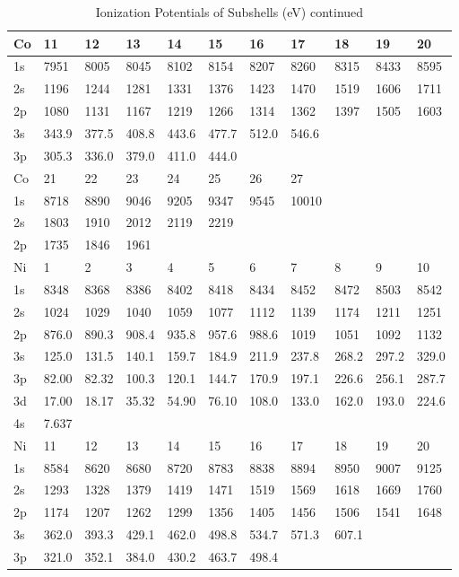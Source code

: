 \begin{table}
\caption{Ionization Potentials of Subshells (eV) continued}
\begin{tabular}{lllllllllll}
\hline
Co& 11&  12&  13&  14&  15&  16&  17&  18&  19&  20\\
\hline
1s&  7951&  8005&  8045&  8102&  8154&
8207&  8260&  8315&  8433&  8595\\
2s&  1196&  1244&  1281&  1331&  1376&  1423&  1470&
1519&  1606&  1711\\
2p&  1080&  1131&  1167&  1219&  1266&  1314&  1362&  1397&  1505&
1603\\
3s& 343.9& 377.5& 408.8& 443.6& 477.7& 512.0& 546.6\\
3p& 305.3& 336.0& 379.0&
411.0&
444.0\\
Co& 21& 22&  23&  24&  25&  26&  27\\
1s&  8718&  8890&  9046&  9205&  9347&  9545&
10010\\
2s&  1803&  1910&  2012&  2119&  2219\\
2p&  1735&  1846&  1961\\
\hline
Ni& 1& 2&  3&
4&   5&   6&   7&   8&   9&  10\\
1s&  8348&  8368&  8386&  8402&  8418&  8434&  8452&  8472&
8503&  8542\\
2s&  1024&  1029&  1040&  1059&  1077&  1112&  1139&  1174&  1211&  1251\\
2p&
876.0& 890.3& 908.4& 935.8& 957.6& 988.6& 1019& 1051& 1092& 1132\\
3s& 125.0& 131.5&
140.1& 159.7& 184.9& 211.9& 237.8& 268.2& 297.2& 329.0\\
3p& 82.00& 82.32& 100.3& 120.1&
144.7& 170.9& 197.1& 226.6& 256.1& 287.7\\
3d& 17.00& 18.17& 35.32& 54.90& 76.10& 108.0&
133.0& 162.0& 193.0& 224.6\\
4s& 7.637\\
\hline
Ni&  11&  12&  13&  14&  15&  16&  17&  18&  19&  20\\
\hline
1s&
8584&  8620&  8680&  8720&  8783&  8838&  8894&  8950&  9007&  9125\\
2s&  1293&  1328&
1379&  1419&  1471&  1519&  1569&  1618&  1669&  1760\\
2p&  1174&  1207&  1262&  1299&
1356&  1405&  1456&  1506&  1541&  1648\\
3s& 362.0& 393.3& 429.1& 462.0& 498.8& 534.7&
571.3& 607.1\\
3p& 321.0& 352.1& 384.0& 430.2& 463.7& 498.4\\
\hline

\end{tabular}
\end{table}
